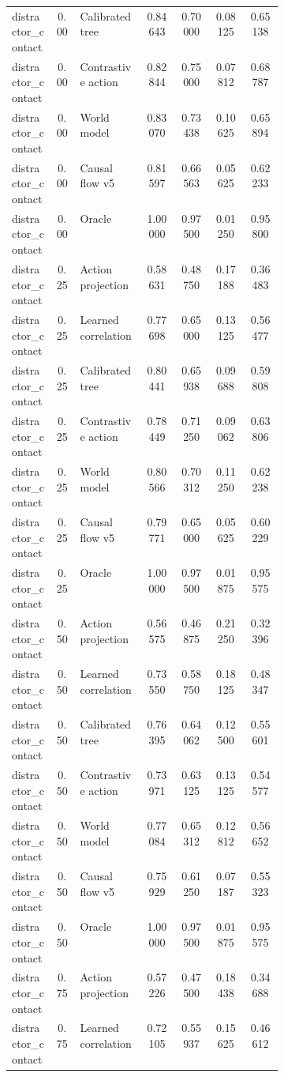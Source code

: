 \documentclass{article}
\begin{document}
\begin{center}
\begin{longtable}{p{0.16\linewidth}cp{0.24\linewidth}cccc}
distractor\_contact & 0.00 & Calibrated tree & 0.84643 & 0.70000 & 0.08125 & 0.65138\\
distractor\_contact & 0.00 & Contrastive action & 0.82844 & 0.75000 & 0.07812 & 0.68787\\
distractor\_contact & 0.00 & World model & 0.83070 & 0.73438 & 0.10625 & 0.65894\\
distractor\_contact & 0.00 & Causal flow v5 & 0.81597 & 0.66563 & 0.05625 & 0.62233\\
distractor\_contact & 0.00 & Oracle & 1.00000 & 0.97500 & 0.01250 & 0.95800\\
distractor\_contact & 0.25 & Action projection & 0.58631 & 0.48750 & 0.17188 & 0.36483\\
distractor\_contact & 0.25 & Learned correlation & 0.77698 & 0.65000 & 0.13125 & 0.56477\\
distractor\_contact & 0.25 & Calibrated tree & 0.80441 & 0.65938 & 0.09688 & 0.59808\\
distractor\_contact & 0.25 & Contrastive action & 0.78449 & 0.71250 & 0.09062 & 0.63806\\
distractor\_contact & 0.25 & World model & 0.80566 & 0.70312 & 0.11250 & 0.62238\\
distractor\_contact & 0.25 & Causal flow v5 & 0.79771 & 0.65000 & 0.05625 & 0.60229\\
distractor\_contact & 0.25 & Oracle & 1.00000 & 0.97500 & 0.01875 & 0.95575\\
distractor\_contact & 0.50 & Action projection & 0.56575 & 0.46875 & 0.21250 & 0.32396\\
distractor\_contact & 0.50 & Learned correlation & 0.73550 & 0.58750 & 0.18125 & 0.48347\\
distractor\_contact & 0.50 & Calibrated tree & 0.76395 & 0.64062 & 0.12500 & 0.55601\\
distractor\_contact & 0.50 & Contrastive action & 0.73971 & 0.63125 & 0.13125 & 0.54577\\
distractor\_contact & 0.50 & World model & 0.77084 & 0.65312 & 0.12812 & 0.56652\\
distractor\_contact & 0.50 & Causal flow v5 & 0.75929 & 0.61250 & 0.07187 & 0.55323\\
distractor\_contact & 0.50 & Oracle & 1.00000 & 0.97500 & 0.01875 & 0.95575\\
distractor\_contact & 0.75 & Action projection & 0.57226 & 0.47500 & 0.18438 & 0.34688\\
distractor\_contact & 0.75 & Learned correlation & 0.72105 & 0.55937 & 0.15625 & 0.46612\\

\end{longtable}
\end{center}
\end{document}
